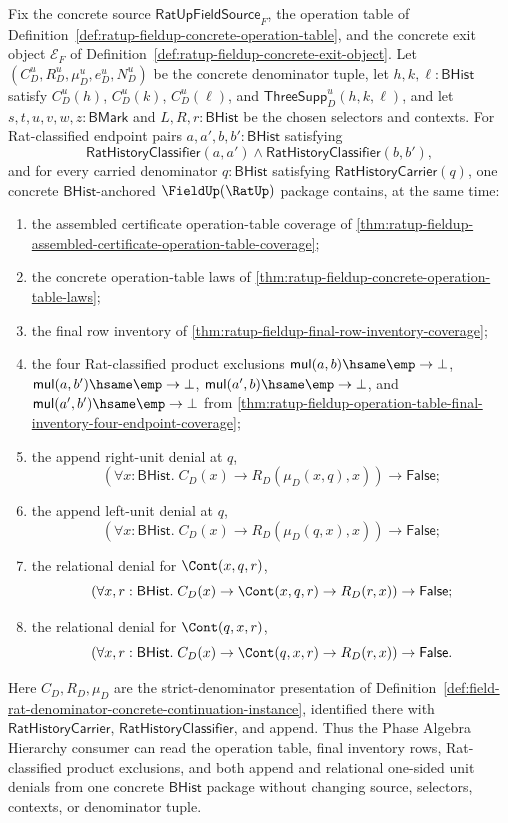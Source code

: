 \begin{theorem}
\label{thm:ratup-fieldup-operation-table-final-inventory-two-sided-unit-coverage}
Fix the concrete source $\mathsf{RatUpFieldSource}_F$, the operation table of
Definition~\ref{def:ratup-fieldup-concrete-operation-table}, and the concrete
exit object $\mathcal E_F$ of
Definition~\ref{def:ratup-fieldup-concrete-exit-object}. Let
$(C_D^u,R_D^u,\mu_D^u,e_D^u,N_D^u)$ be the concrete denominator tuple, let
$h,k,\ell:\mathsf{BHist}$ satisfy $C_D^u(h)$, $C_D^u(k)$, $C_D^u(\ell)$, and
$\mathsf{ThreeSupp}_D^u(h,k,\ell)$, and let
$s,t,u,v,w,z:\mathsf{BMark}$ and $L,R,r:\mathsf{BHist}$ be the chosen selectors
and contexts. For Rat-classified endpoint pairs
$a,a',b,b':\mathsf{BHist}$ satisfying
$$
\mathsf{RatHistoryClassifier}(a,a')
\land
\mathsf{RatHistoryClassifier}(b,b'),
$$
and for every carried denominator $q:\mathsf{BHist}$ satisfying
$\mathsf{RatHistoryCarrier}(q)$, one concrete $\mathsf{BHist}$-anchored
$\FieldUp(\RatUp)$ package contains, at the same time:
\begin{enumerate}
  \item the assembled certificate operation-table coverage of
  \autoref{thm:ratup-fieldup-assembled-certificate-operation-table-coverage};
  \item the concrete operation-table laws of
  \autoref{thm:ratup-fieldup-concrete-operation-table-laws};
  \item the final row inventory of
  \autoref{thm:ratup-fieldup-final-row-inventory-coverage};
  \item the four Rat-classified product exclusions
  $\mathsf{mul}(a,b)\hsame\emp\to\bot$,
  $\mathsf{mul}(a,b')\hsame\emp\to\bot$,
  $\mathsf{mul}(a',b)\hsame\emp\to\bot$, and
  $\mathsf{mul}(a',b')\hsame\emp\to\bot$ from
  \autoref{thm:ratup-fieldup-operation-table-final-inventory-four-endpoint-coverage};
  \item the append right-unit denial at $q$,
  $$
  (\forall x:\mathsf{BHist}.\;
  C_D(x)\to R_D(\mu_D(x,q),x))\to \mathsf{False};
  $$
  \item the append left-unit denial at $q$,
  $$
  (\forall x:\mathsf{BHist}.\;
  C_D(x)\to R_D(\mu_D(q,x),x))\to \mathsf{False};
  $$
  \item the relational denial for $\Cont(x,q,r)$,
  $$
  (\forall x,r:\mathsf{BHist}.\;
  C_D(x)\to \Cont(x,q,r)\to R_D(r,x))\to \mathsf{False};
  $$
  \item the relational denial for $\Cont(q,x,r)$,
  $$
  (\forall x,r:\mathsf{BHist}.\;
  C_D(x)\to \Cont(q,x,r)\to R_D(r,x))\to \mathsf{False}.
  $$
\end{enumerate}
Here $C_D,R_D,\mu_D$ are the strict-denominator presentation of
Definition~\ref{def:field-rat-denominator-concrete-continuation-instance},
identified there with $\mathsf{RatHistoryCarrier}$,
$\mathsf{RatHistoryClassifier}$, and append. Thus the Phase Algebra Hierarchy
consumer can read the operation table, final inventory rows, Rat-classified
product exclusions, and both append and relational one-sided unit denials from
one concrete $\mathsf{BHist}$ package without changing source, selectors,
contexts, or denominator tuple.
\end{theorem}
